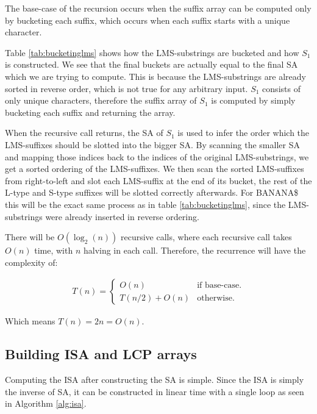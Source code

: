 The base-case of the recursion occurs when the suffix array can be computed only by
bucketing each suffix, which occurs when each suffix starts with a unique character. 

Table \ref{tab:bucketinglms} shows how the LMS-substrings are bucketed and how $S_1$ is
constructed. We see that the final buckets are actually equal to the final SA which we are
trying to compute. This is because the LMS-substrings are already sorted in reverse order,
which is not true for any arbitrary input. $S_1$ consists of only unique characters,
therefore the suffix array of $S_1$ is computed by simply bucketing each suffix and
returning the array.

When the recursive call returns, the SA of $S_1$ is used to infer the order which the
LMS-suffixes should be slotted into the bigger SA. By scanning the smaller SA and mapping
those indices back to the indices of the original LMS-substrings, we get a sorted ordering
of the LMS-suffixes. We then scan the sorted LMS-suffixes from right-to-left and slot each
LMS-suffix at the end of its bucket, the rest of the L-type and S-type suffixes will be
slotted correctly afterwards. For BANANA\$ this will be the exact same process as in table
\ref{tab:bucketinglms}, since the LMS-substrings were already inserted in reverse
ordering.

There will be $O(\log_2(n))$ recursive calls, where each recursive call takes $O(n)$ time,
with $n$ halving in each call. Therefore, the recurrence will have the complexity of:

\vspace{-0.5cm}
\begin{gather*}
    T(n) =
\begin{cases}
    O(n) & \text{if base-case.} \\
    T(n / 2) + O(n) & \text{otherwise.}
\end{cases}
\end{gather*}
\vspace{-0.5cm}

Which means $T(n) = 2n = O(n)$.

\subsection*{Building ISA and LCP arrays}

Computing the ISA after constructing the SA is simple. Since the ISA is simply the inverse
of SA, it can be constructed in linear time with a single loop as seen in Algorithm
\ref{alg:isa}.

